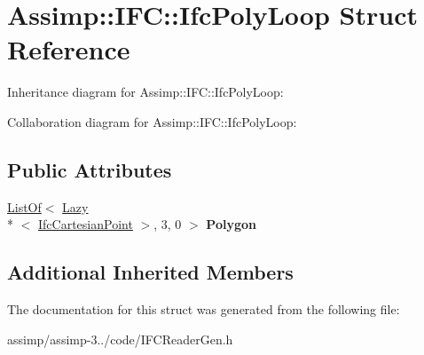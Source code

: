 \hypertarget{struct_assimp_1_1_i_f_c_1_1_ifc_poly_loop}{\section{Assimp\+:\+:I\+F\+C\+:\+:Ifc\+Poly\+Loop Struct Reference}
\label{struct_assimp_1_1_i_f_c_1_1_ifc_poly_loop}
}


Inheritance diagram for Assimp\+:\+:I\+F\+C\+:\+:Ifc\+Poly\+Loop\+:


Collaboration diagram for Assimp\+:\+:I\+F\+C\+:\+:Ifc\+Poly\+Loop\+:
\subsection*{Public Attributes}
\begin{DoxyCompactItemize}
\item 
\hypertarget{struct_assimp_1_1_i_f_c_1_1_ifc_poly_loop_a607159a784419162c9fba2fbea00d9b4}{\hyperlink{struct_assimp_1_1_s_t_e_p_1_1_list_of}{List\+Of}$<$ \hyperlink{struct_assimp_1_1_s_t_e_p_1_1_lazy}{Lazy}\\*
$<$ \hyperlink{struct_assimp_1_1_i_f_c_1_1_ifc_cartesian_point}{Ifc\+Cartesian\+Point} $>$, 3, 0 $>$ {\bfseries Polygon}}\label{struct_assimp_1_1_i_f_c_1_1_ifc_poly_loop_a607159a784419162c9fba2fbea00d9b4}

\end{DoxyCompactItemize}
\subsection*{Additional Inherited Members}


The documentation for this struct was generated from the following file\+:\begin{DoxyCompactItemize}
\item 
assimp/assimp-\/3../code/I\+F\+C\+Reader\+Gen.\+h\end{DoxyCompactItemize}
